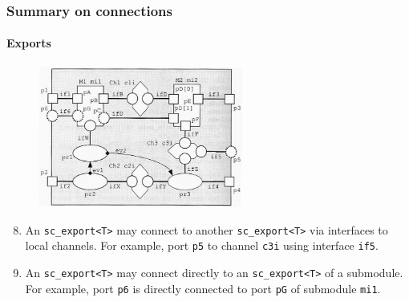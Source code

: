 \begin{frame}
\frametitle{Summary on connections}
\framesubtitle{Exports}

\begin{figure}
\includegraphics[width=0.6\textwidth]{lecture12/img/connections.png}
\end{figure}
{\scriptsize
\begin{enumerate}
\setcounter{enumi}{7}
\item An \texttt{sc\_export<T>} may connect to another \texttt{sc\_export<T>} via interfaces to local channels. For example, port \texttt{p5} to channel \texttt{c3i} using interface \texttt{if5}.
\item An \texttt{sc\_export<T>} may connect directly to an \texttt{sc\_export<T>} of a submodule. For example, port \texttt{p6} is directly connected to port \texttt{pG} of submodule \texttt{mi1}.
\end{enumerate}
}
\end{frame}